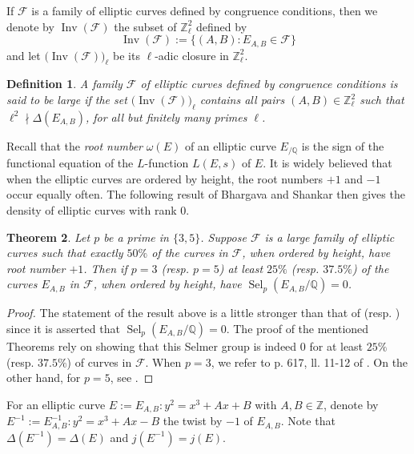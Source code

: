 \documentclass[12pt]{amsart}
\newtheorem{theorem}{Theorem}[section]
\newtheorem{definition}[theorem]{Definition}
\newcommand{\cF}{\mathcal{F}}
\newcommand{\Z}{\mathbb{Z}}
\newcommand{\Q}{\mathbb{Q}}
\newcommand{\op}[1]{\operatorname{#1}}
\numberwithin{equation}{section}
\begin{document}
\par If $\mathcal{F}$ is a family of elliptic curves defined by congruence conditions, then we denote by $\op{Inv}(\mathcal{F})$ the subset of $\Z_\ell^2$ defined by \[\op{Inv}(\mathcal{F}):=\{(A,B): E_{A,B} \in \mathcal{F}\}\] and let $\big(\op{Inv}(\mathcal{F})\big)_\ell$ be its $\ell$-adic closure in $\Z_\ell^2$.
\begin{definition}
    A family $\mathcal{F}$ of elliptic curves defined by congruence conditions is said to be large if the set $\big(\op{Inv}(\mathcal{F})\big)_\ell$ contains all pairs $(A,B) \in \Z_\ell^2$ such that $\ell^2 \nmid \Delta(E_{A,B})$, for all but finitely many primes $\ell$.
\end{definition}
Recall that the \emph{root number} $\omega(E)$ of an elliptic curve $E_{/\Q}$ is the sign of the functional equation of the $L$-function $L(E,s)$ of $E$. It is widely believed that when the elliptic curves are ordered by height, the root numbers $+1$ and $-1$ occur equally often. The following result of Bhargava and Shankar \cite[Theorem 41]{bhargavashankar15} then gives the density of elliptic curves with rank $0$.
\begin{theorem}\label{thm of bhargava shankar}
   Let $p$ be a prime in $\{3,5\}$. Suppose $\mathcal{F}$ is a large family of elliptic curves such that exactly $50\%$ of the curves in $\mathcal{F}$, when ordered by height, have root number $+1$. Then if $p=3$ (resp. $p=5$) at least $25\%$ (resp. $37.5\%$) of the curves $E_{A,B}$ in $\mathcal{F}$, when ordered by height, have $\op{Sel}_p(E_{A,B}/\Q)=0$.
\end{theorem}

\begin{proof}
    The statement of the result above is a little stronger than that of \cite[Theorem 41]{bhargavashankar15} (resp. \cite[Proposition 40]{bhargavashankar5}) since it is asserted that $\op{Sel}_p(E_{A,B}/\Q)=0$. The proof of the mentioned Theorems rely on showing that this Selmer group is indeed $0$ for at least $25\%$ (resp. $37.5\%$) of curves in $\cF$. When $p=3$, we refer to p. 617, ll. 11-12 of \cite{bhargavashankar15}. On the other hand, for $p=5$, see \cite[p.29, l. -7]{bhargavashankar5}. 
\end{proof}


For an elliptic curve $E:=E_{A,B}:y^2=x^3+Ax+B$ with $A, B \in\Z$, denote by $E^{-1}:=E^{-1}_{A,B}:y^2=x^3+Ax-B$ the twist by $-1$ of $E_{A,B}$. Note that $\Delta(E^{-1})=\Delta(E)$ and $j(E^{-1})=j(E)$. 
\end{document}
